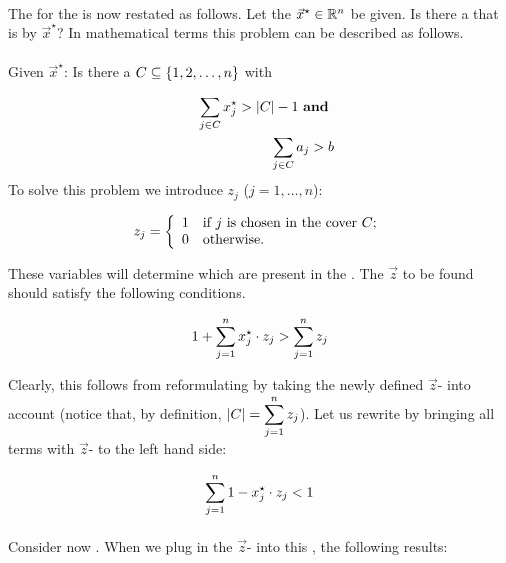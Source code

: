 \paragraph{}
The  for the  is now restated as follows. Let the  $\vec{x}^{\star}\in\RRR^n$ be given. Is there a  that is  by $\vec{x}^{\star}$? In mathematical terms this problem can be described as follows.

\paragraph{}
Given $\vec{x}^{\star}$: Is there a $C\subseteq\accl{1,2,\ldots,n}$ with

\begin{eqnarray}
&&\sumdomain[j]{C}{x_j^{\star}}>\abs{C}-1\xand\eqnlab{sep-c1}\\
&&\sumdomain[j]{C}{a_j}>b\eqnlab{sep-c2}
\end{eqnarray}
To solve this problem we introduce  $z_j$ ($j=1,\ldots,n$):

\begin{equation}
\semboolvar{z_j}{if $j$ is chosen in the cover $C$;}{otherwise.}
\end{equation}

These variables will determine which  are present in the . The  $\vec{z}$ to be found should satisfy the following conditions.

\begin{equation}
1+\sumieqb[j]{1}{n}{x_j^{\star}\cdot z_j}>\sumieqb[j]{1}{n}{z_j}\eqnlab{setcoversep}
\end{equation}

Clearly, this  follows from reformulating  by taking the newly defined $\vec{z}$- into account (notice that, by definition, $\abs{C}=\sumieqb[j]{1}{n}{z_j}$). Let us rewrite   by bringing all terms with $\vec{z}$- to the left hand side:

\begin{equation}
\sumieqb[j]{1}{n}{1-x_j^{\star}}\cdot z_j<1
\end{equation}

\paragraph{}
Consider now  . When we plug in the $\vec{z}$- into this , the following  results:


